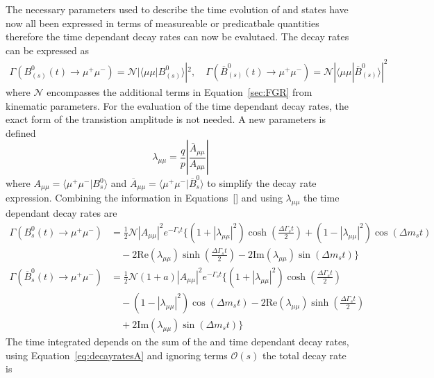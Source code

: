The necessary parameters used to describe the time evolution of \bsd and \barbsd states have now all been expressed in terms of measureable or predicatbale quantities therefore the time dependant decay rates can now be evalutaed. The decay rates can be expressed as
\begin{align}
\Gamma (B^0_{(s)}(t) \to \mu^+ \mu^-) = \mathcal{N}|\langle \mu \mu | B^0_{(s)} \rangle|^2, \quad
\Gamma (\overline{B}^0_{(s)}(t) \to \mu^+ \mu^-) =\mathcal{N}|\langle \mu\mu | \overline{B}^0_{(s)} \rangle|^2
\end{align}
where $\mathcal{N}$ encompasses the additional terms in Equation~\ref{sec:FGR} from kinematic parameters. For the evaluation of the time dependant decay rates, the exact form of the transistion amplitude is not needed. A new parameters is defined
\begin{equation}
\lambda_{\mu\mu} = \frac{q}{p} \left| \frac{\overline{A}_{\mu\mu}}{A_{\mu\mu}}\right|
\end{equation}
where $A_{\mu\mu} = \langle \mu^+\mu^- | B^0_s \rangle$ and $\overline{A}_{\mu\mu} = \langle \mu^+\mu^- |\overline{B}^0_s \rangle$ to simplify the decay rate expression. Combining the information in Equations~\ref{} and using $\lambda_{\mu\mu}$ the time dependant decay rates are
\begin{align}
\Gamma(B^0_s(t) \to \mu^+ \mu^-) &=  \frac{1}{2} \mathcal{N} |A_{\mu\mu}|^2 e^{- \Gamma_s t} \bigg\{ (1 + |\lambda_{\mu\mu}|^2) \cosh \left( \frac{\Delta \Gamma_s t}{2} \right) + ( 1 - |\lambda_{\mu\mu}|^2) \cos(\Delta m_s t) \nonumber \\
& \quad {}- 2\mathrm{Re}(\lambda_{\mu\mu})\sinh \left(\frac{\Delta \Gamma_s t}{2}\right) - 2\mathrm{Im}(\lambda_{\mu\mu})\sin(\Delta m_s t) \bigg\} \\
\Gamma(\overline{B}^0_s(t) \to \mu^+ \mu^-) &=  \frac{1}{2} \mathcal{N} (1 + a)|A_{\mu\mu}|^2 e^{- \Gamma_s t} \bigg\{ (1 + |\lambda_{\mu\mu}|^2) \cosh \left( \frac{\Delta \Gamma_s t}{2} \right) \nonumber \\
& \quad {}- ( 1 - |\lambda_{\mu\mu}|^2) \cos(\Delta m_s t) -2\mathrm{Re}(\lambda_{\mu\mu})\sinh \left(\frac{\Delta \Gamma_s t}{2}\right) \nonumber\\ 
& \quad {}+ 2\mathrm{Im}(\lambda_{\mu\mu})\sin(\Delta m_s t) \bigg\}
\label{eq:decayratesA}
\end{align}
The time integrated \BF depends on the sum of the \bsd and \barbsd time dependant decay rates, using Equation~\ref{eq:decayratesA} and ignoring terms $\mathcal{O}(s)$ the total decay rate is
